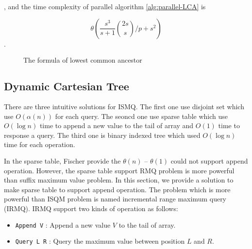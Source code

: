 , and the time complexity of parallel algorithm \ref{alg:parallel-LCA}
is

\begin{equation}
\theta\left(\frac{s^3}{s+1} \binom{2s}{s} \bigg/ p + s^2 \right)
\end{equation}.

\begin{figure*}[!thb]
  
  \caption{The formula of lowest common ancestor}
  \label{fun:LCA}
\end{figure*}



\subsection{Dynamic Cartesian Tree}

There are three intuitive solutions for ISMQ. The first one use
disjoint set which use $O(\alpha(n))$ for each query. The seoncd one
use sparse table which use $O(\log n)$ time to append a new value to
the tail of array and $O(1)$ time to response a query. The third one
is binary indexed tree which used $O(\log n)$ time for each operation.

In the sparse table, Fischer provide the $\theta(n)$ -- $\theta(1)$
could not support append operation.  However, the sparse table support
RMQ problem is more powerful than suffix maximum value problem. In
this section, we provide a solution to make sparse table to support
append operation. The problem which is more powerful than ISQM problem
is named incremental range maximum query (IRMQ). IRMQ support two
kinds of operation as follows:

\begin{itemize}
  \item 
  	\texttt{Append V} : Append a new value $V$ to the tail of array.

  \item
    \texttt{Query L R} : Query the maximum value between position $L$
and $R$. 

\end{itemize}
